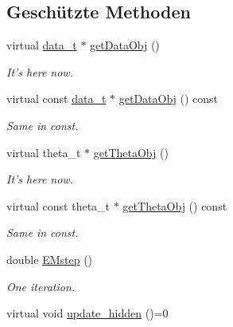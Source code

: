 \subsection*{Geschützte Methoden}
\begin{DoxyCompactItemize}
\item 
virtual \hyperlink{classCDA_1_1EM_a3f4735ec5ea6c523ebc4c9f2b51be762}{data\_\-t} $\ast$ \hyperlink{classCDA_1_1EM_a15809e2026eaea4c68b2e3e11c807fff}{getDataObj} ()
\begin{DoxyCompactList}\small\item\em It's here now. \item\end{DoxyCompactList}\item 
virtual const \hyperlink{classCDA_1_1EM_a3f4735ec5ea6c523ebc4c9f2b51be762}{data\_\-t} $\ast$ \hyperlink{classCDA_1_1EM_ac8ac2e223a295ee8f98e13c50bfec454}{getDataObj} () const 
\begin{DoxyCompactList}\small\item\em Same in const. \item\end{DoxyCompactList}\item 
virtual theta\_\-t $\ast$ \hyperlink{classCDA_1_1EM_aee121bf43a5a5d1a24cfecb2cbd97e18}{getThetaObj} ()
\begin{DoxyCompactList}\small\item\em It's here now. \item\end{DoxyCompactList}\item 
virtual const theta\_\-t $\ast$ \hyperlink{classCDA_1_1EM_aa44545f82da81d3edaee49e34077f58e}{getThetaObj} () const 
\begin{DoxyCompactList}\small\item\em Same in const. \item\end{DoxyCompactList}\item 
double \hyperlink{classCDA_1_1EM_a33684f64b72aff4c65150e12ea23e6aa}{EMstep} ()
\begin{DoxyCompactList}\small\item\em One iteration. \item\end{DoxyCompactList}\item 
\hypertarget{classCDA_1_1EM_a587d80945cad21df1233dc22cb95671d}{
virtual void \hyperlink{classCDA_1_1EM_a587d80945cad21df1233dc22cb95671d}{update\_\-hidden} ()=0}
\label{classCDA_1_1EM_a587d80945cad21df1233dc22cb95671d}


\end{DoxyCompactItemize}
